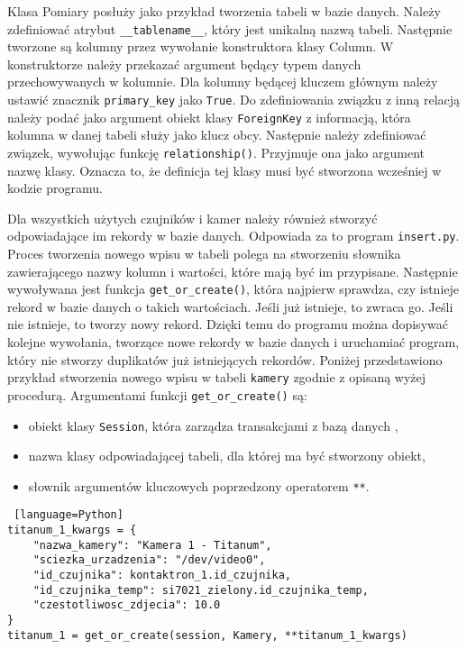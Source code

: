 \documentclass[a4paper,11pt,twoside]{article}
\begin{document}
Klasa Pomiary posłuży jako przykład tworzenia tabeli w bazie danych. Należy zdefiniować atrybut \texttt{{\_\_}tablename{\_\_}}, który jest unikalną nazwą tabeli. Następnie tworzone są kolumny przez wywołanie konstruktora klasy Column. W konstruktorze należy przekazać argument będący typem danych przechowywanych w kolumnie. Dla kolumny będącej kluczem głównym należy ustawić znacznik \texttt{primary{\_}key} jako \texttt{True}. Do zdefiniowania związku z inną relacją należy podać jako argument obiekt klasy \texttt{ForeignKey} z informacją, która kolumna w danej tabeli służy jako klucz obcy. Następnie należy zdefiniować związek, wywołując funkcję \texttt{relationship()}. Przyjmuje ona jako argument nazwę klasy. Oznacza to, że definicja tej klasy musi być stworzona wcześniej w kodzie programu.

Dla wszystkich użytych czujników i kamer należy również stworzyć odpowiadające im rekordy w bazie danych. Odpowiada za to program \texttt{insert.py}. Proces tworzenia nowego wpisu w tabeli polega na stworzeniu słownika zawierającego nazwy kolumn i wartości, które mają być im przypisane. Następnie wywoływana jest funkcja \texttt{get{\_}or{\_}create()}, która najpierw sprawdza, czy istnieje rekord w bazie danych o takich wartościach. Jeśli już istnieje, to zwraca go. Jeśli nie istnieje, to tworzy nowy rekord. Dzięki temu do programu można dopisywać kolejne wywołania, tworzące nowe rekordy w bazie danych i uruchamiać program, który nie stworzy duplikatów już istniejących rekordów. Poniżej przedstawiono przykład stworzenia nowego wpisu w tabeli \texttt{kamery} zgodnie z opisaną wyżej procedurą. Argumentami funkcji \texttt{get{\_}or{\_}create()} są:
\begin{itemize}
\item obiekt klasy \texttt{Session}, która zarządza transakcjami z bazą danych \cite{sqlalchemy-session},
\item nazwa klasy odpowiadającej tabeli, dla której ma być stworzony obiekt,
\item słownik argumentów kluczowych poprzedzony operatorem \texttt{**}.
\end{itemize}
\begin{lstlisting} [language=Python]
titanum_1_kwargs = {
    "nazwa_kamery": "Kamera 1 - Titanum",
    "sciezka_urzadzenia": "/dev/video0",
    "id_czujnika": kontaktron_1.id_czujnika,
    "id_czujnika_temp": si7021_zielony.id_czujnika_temp,
    "czestotliwosc_zdjecia": 10.0
}
titanum_1 = get_or_create(session, Kamery, **titanum_1_kwargs)
\end{lstlisting}
\end{document}
